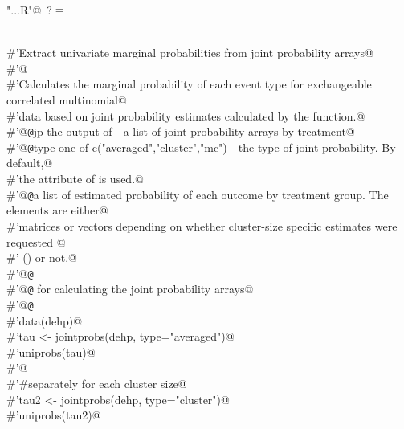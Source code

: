 \documentclass[reqno]{amsart}
\renewcommand{\NWtarget}[2]{\hypertarget{#1}{#2}}
\begin{document}
\begin{flushleft} \small\label{scrap40}\raggedright\small
\NWtarget{nuweb?}{} \verb@"..\R\ExchMultinomial.R"@\nobreak\ {\footnotesize {?}}$\equiv$
\vspace{-1ex}
\begin{list}{}{} \item
\mbox{}\verb@@\\
\mbox{}\verb@#'Extract univariate marginal probabilities from joint probability arrays@\\
\mbox{}\verb@#'@\\
\mbox{}\verb@#'Calculates the marginal probability of each event type for exchangeable correlated multinomial@\\
\mbox{}\verb@#'data based on joint probability estimates calculated by the  function.@\\
\mbox{}\verb@#'@{\tt @}\verb@param jp the output of  - a list of joint probability arrays by treatment@\\
\mbox{}\verb@#'@{\tt @}\verb@param type one of c("averaged","cluster","mc") - the type of joint probability. By default,@\\
\mbox{}\verb@#'the  attribute of  is used.@\\
\mbox{}\verb@#'@{\tt @}\verb@return a list of estimated probability of each outcome by treatment group. The elements are either@\\
\mbox{}\verb@#'matrices or vectors depending on whether cluster-size specific estimates were requested @\\
\mbox{}\verb@#' () or not.@\\
\mbox{}\verb@#'@{\tt @}\verb@export@\\
\mbox{}\verb@#'@{\tt @}\verb@seealso {} for calculating the joint probability arrays@\\
\mbox{}\verb@#'@{\tt @}\verb@examples@\\
\mbox{}\verb@#'data(dehp)@\\
\mbox{}\verb@#'tau <- jointprobs(dehp, type="averaged")@\\
\mbox{}\verb@#'uniprobs(tau)@\\
\mbox{}\verb@#'@\\
\mbox{}\verb@#'#separately for each cluster size@\\
\mbox{}\verb@#'tau2 <- jointprobs(dehp, type="cluster")@\\
\mbox{}\verb@#'uniprobs(tau2)@\\

\end{list}
\end{flushleft}
\end{document}
